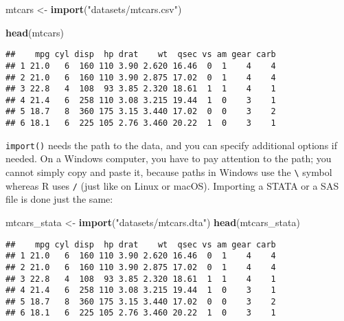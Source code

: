 \documentclass[
]{article}
\newenvironment{Shaded}{\begin{snugshade}}{\end{snugshade}}
\newcommand{\KeywordTok}[1]{\textcolor[rgb]{0.13,0.29,0.53}{\textbf{#1}}}
\newcommand{\NormalTok}[1]{#1}
\newcommand{\StringTok}[1]{\textcolor[rgb]{0.31,0.60,0.02}{#1}}
\begin{document}
\begin{Shaded}
\begin{Highlighting}[]
\NormalTok{mtcars \textless{}{-}}\StringTok{ }\KeywordTok{import}\NormalTok{(}\StringTok{"datasets/mtcars.csv"}\NormalTok{)}
\end{Highlighting}
\end{Shaded}

\begin{Shaded}
\begin{Highlighting}[]
\KeywordTok{head}\NormalTok{(mtcars)}
\end{Highlighting}
\end{Shaded}

\begin{verbatim}
##    mpg cyl disp  hp drat    wt  qsec vs am gear carb
## 1 21.0   6  160 110 3.90 2.620 16.46  0  1    4    4
## 2 21.0   6  160 110 3.90 2.875 17.02  0  1    4    4
## 3 22.8   4  108  93 3.85 2.320 18.61  1  1    4    1
## 4 21.4   6  258 110 3.08 3.215 19.44  1  0    3    1
## 5 18.7   8  360 175 3.15 3.440 17.02  0  0    3    2
## 6 18.1   6  225 105 2.76 3.460 20.22  1  0    3    1
\end{verbatim}

\texttt{import()} needs the path to the data, and you can specify additional options if needed. On a
Windows computer, you have to pay attention to the path; you cannot simply copy and paste it, because
paths in Windows use the \texttt{\textbackslash{}} symbol whereas R uses \texttt{/} (just like on Linux or macOS).
Importing a STATA or a SAS file is done just the same:

\begin{Shaded}
\begin{Highlighting}[]
\NormalTok{mtcars\_stata \textless{}{-}}\StringTok{ }\KeywordTok{import}\NormalTok{(}\StringTok{"datasets/mtcars.dta"}\NormalTok{)}
\KeywordTok{head}\NormalTok{(mtcars\_stata)}
\end{Highlighting}
\end{Shaded}

\begin{verbatim}
##    mpg cyl disp  hp drat    wt  qsec vs am gear carb
## 1 21.0   6  160 110 3.90 2.620 16.46  0  1    4    4
## 2 21.0   6  160 110 3.90 2.875 17.02  0  1    4    4
## 3 22.8   4  108  93 3.85 2.320 18.61  1  1    4    1
## 4 21.4   6  258 110 3.08 3.215 19.44  1  0    3    1
## 5 18.7   8  360 175 3.15 3.440 17.02  0  0    3    2
## 6 18.1   6  225 105 2.76 3.460 20.22  1  0    3    1
\end{verbatim}
\end{document}
